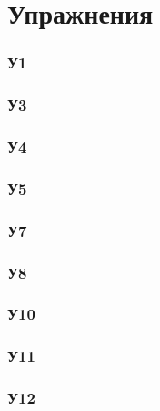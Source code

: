 \section{Упражнения}

\subsubsection*{У1}


% 

\subsubsection*{У3}


\subsubsection*{У4}


\subsubsection*{У5}


% 

\subsubsection*{У7}


\subsubsection*{У8}


% 

\subsubsection*{У10}


\subsubsection*{У11}


\subsubsection*{У12}








